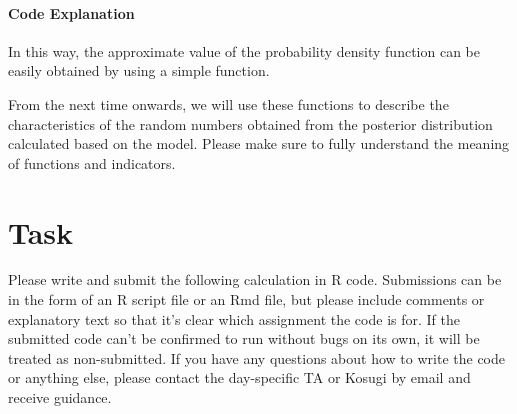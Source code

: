 \documentclass{ltjsbook}
\begin{document}
\paragraph{Code Explanation}


In this way, the approximate value of the probability density function can be easily obtained by using a simple function.

From the next time onwards, we will use these functions to describe the characteristics of the random numbers obtained from the posterior distribution calculated based on the model.
Please make sure to fully understand the meaning of functions and indicators.
\section{Task}
Please write and submit the following calculation in R code. Submissions can be in the form of an R script file or an Rmd file, but please include comments or explanatory text so that it's clear which assignment the code is for. If the submitted code can't be confirmed to run without bugs on its own, it will be treated as non-submitted. If you have any questions about how to write the code or anything else, please contact the day-specific TA or Kosugi by email and receive guidance.

\end{document}
